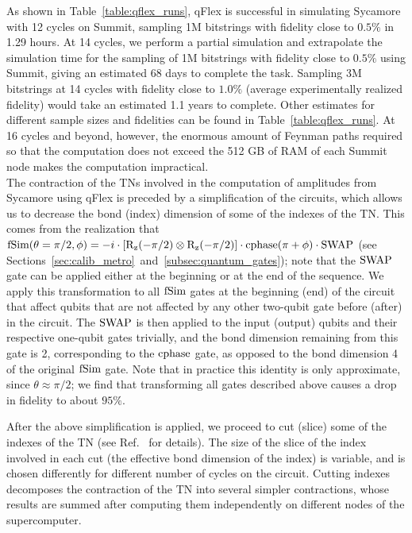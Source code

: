 As shown in Table~\ref{table:qflex_runs}, qFlex is successful in simulating Sycamore with 12 cycles on Summit, sampling 1M bitstrings with fidelity close to $0.5\%$ in 1.29 hours. At 14 cycles, we perform a partial simulation and extrapolate the simulation time for the sampling of 1M bitstrings with fidelity close to $0.5\%$ using Summit, giving an estimated 68 days to complete the task. Sampling 3M bitstrings at 14 cycles with fidelity close to $1.0\%$ (average experimentally realized fidelity) would take an estimated 1.1 years to complete. Other estimates for different sample sizes and fidelities can be found in Table~\ref{table:qflex_runs}. At 16 cycles and beyond, however, the enormous amount of Feynman paths required so that the computation does not exceed the 512 GB of RAM of each Summit node makes the computation impractical.\\

The contraction of the TNs involved in the computation of amplitudes from Sycamore using qFlex is preceded by a simplification of the circuits, which allows us to decrease the bond (index) dimension of some of the indexes of the TN. This comes from the realization that ${\rm fSim(\theta=\pi/2, \phi)} = -i\cdot[{\rm R_z (-\pi/2) \otimes R_z(-\pi/2)}]\cdot{\rm cphase(\pi+\phi)}\cdot{\rm SWAP}$ (see Sections~\ref{sec:calib_metro}~and~\ref{subsec:quantum_gates}); note that the ${\rm SWAP}$ gate can be applied either at the beginning or at the end of the sequence. We apply this transformation to all ${\rm fSim}$ gates at the beginning (end) of the circuit that affect qubits that are not affected by any other two-qubit gate before (after) in the circuit. The ${\rm SWAP}$ is then applied to the input (output) qubits and their respective one-qubit gates trivially, and the bond dimension remaining from this gate is 2, corresponding to the ${\rm cphase}$ gate, as opposed to the bond dimension 4 of the original ${\rm fSim}$ gate. Note that in practice this identity is only approximate, since $\theta\approx \pi/2$; we find that transforming all gates described above causes a drop in fidelity to about $95\%$.

After the above simplification is applied, we proceed to cut (slice) some of the indexes of the TN (see Ref.~\cite{villalonga2019flexible} for details). The size of the slice of the index involved in each cut (the effective bond dimension of the index) is variable, and is chosen differently for different number of cycles on the circuit. Cutting indexes decomposes the contraction of the TN into several simpler contractions, whose results are summed after computing them independently on different nodes of the supercomputer.

